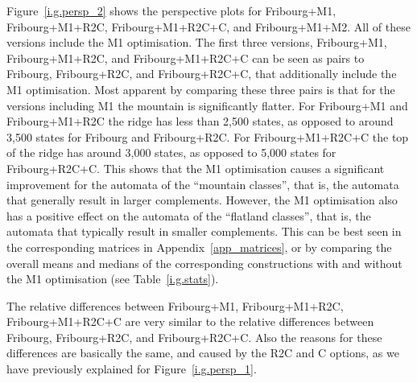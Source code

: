 Figure~\ref{i.g.persp_2} shows the perspective plots for Fribourg+M1, Fribourg+M1+R2C, Fribourg+M1+R2C+C, and Fribourg+M1+M2. All of these versions include the M1 optimisation. The first three versions, Fribourg+M1, Fribourg+M1+R2C, and Fribourg+M1+R2C+C can be seen as pairs to Fribourg, Fribourg+R2C, and Fribourg+R2C+C, that additionally include the M1 optimisation. Most apparent by comparing these three pairs is that for the versions including M1 the mountain is significantly flatter. For Fribourg+M1 and Fribourg+M1+R2C the ridge has less than 2,500 states, as opposed to around 3,500 states for Fribourg and Fribourg+R2C. For Fribourg+M1+R2C+C the top of the ridge has around 3,000 states, as opposed to 5,000 states for Fribourg+R2C+C. This shows that the M1 optimisation causes a significant improvement for the automata of the ``mountain classes'', that is, the automata that generally result in larger complements. However, the M1 optimisation also has a positive effect on the automata of the ``flatland classes'', that is, the automata that typically result in smaller complements. This can be best seen in the corresponding matrices in Appendix~\ref{app_matrices}, or by comparing the overall means and  medians of the corresponding constructions with and without the M1 optimisation (see Table~\ref{i.g.stats}).

The relative differences between Fribourg+M1, Fribourg+M1+R2C, Fribourg+M1+R2C+C are very similar to the relative differences between Fribourg, Fribourg+R2C, and Fribourg+R2C+C. Also the reasons for these differences are basically the same, and caused by the R2C and C options, as we have previously explained for Figure~\ref{i.g.persp_1}.

